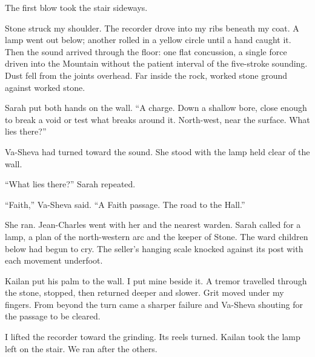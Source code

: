 The first blow took the stair sideways.\par

Stone struck my shoulder. The recorder drove into my ribs beneath my coat. A lamp went out below; another rolled in a yellow circle until a hand caught it. Then the sound arrived through the floor: one flat concussion, a single force driven into the Mountain without the patient interval of the five-stroke sounding. Dust fell from the joints overhead. Far inside the rock, worked stone ground against worked stone.\par

Sarah put both hands on the wall. ``A charge. Down a shallow bore, close enough to break a void or test what breaks around it. North-west, near the surface. What lies there?''\par

Va-Sheva had turned toward the sound. She stood with the lamp held clear of the wall.\par

``What lies there?'' Sarah repeated.\par

``Faith,'' Va-Sheva said. ``A Faith passage. The road to the Hall.''\par

She ran. Jean-Charles went with her and the nearest warden. Sarah called for a lamp, a plan of the north-western arc and the keeper of Stone. The ward children below had begun to cry. The seller's hanging scale knocked against its post with each movement underfoot.\par

Kailan put his palm to the wall. I put mine beside it. A tremor travelled through the stone, stopped, then returned deeper and slower. Grit moved under my fingers. From beyond the turn came a sharper failure and Va-Sheva shouting for the passage to be cleared.\par

I lifted the recorder toward the grinding. Its reels turned. Kailan took the lamp left on the stair. We ran after the others.\par
